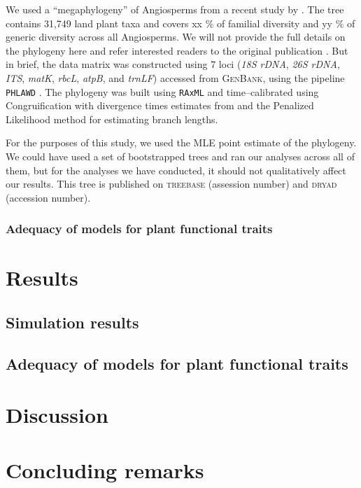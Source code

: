 \documentclass[12pt]{article}
\begin{document}
We used a ``megaphylogeny'' of Angiosperms from a recent study by \citet{ZanneBigTree}. The tree contains 31,749 land plant taxa and covers xx \% of familial diversity and yy \% of generic diversity across all Angiosperms. We will not provide the full details on the phylogeny here and refer interested readers to the original publication \citep{ZanneBigTree}. But in brief, the data matrix was constructed using 7 loci (\textit{18S rDNA}, \textit{26S rDNA}, \textit{ITS}, \textit{matK}, \textit{rbcL}, \textit{atpB}, and \textit{trnLF}) accessed from \textsc{GenBank}, using the pipeline \texttt{PHLAWD} \citep{phlawd}. The phylogeny was built using \texttt{RAxML} \citep{raxml} and time--calibrated using Congruification \citep{Eastmancongruify} with divergence times estimates from \citet{TankPR} and the Penalized Likelihood method \citep{Sanderson1997, treepl} for estimating branch lengths.

For the purposes of this study, we used the MLE point estimate of the phylogeny. We could have used a set of bootstrapped trees and ran our analyses across all of them, but for the analyses we have conducted, it should not qualitatively affect our results. This tree is published on \textsc{treebase} (assession number) and \textsc{dryad} (accession number).

\subsubsection{Adequacy of models for plant functional traits}


\section{Results}

\subsection{Simulation results}

\subsection{Adequacy of models for plant functional traits}


\section{Discussion}

\section{Concluding remarks}
\end{document}

